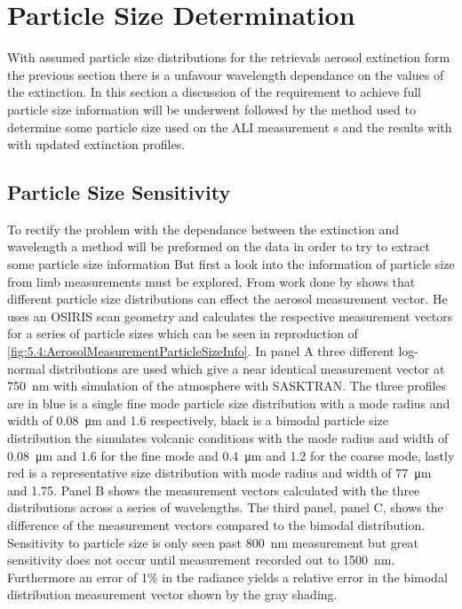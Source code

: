 \section{Particle Size Determination}
\label{sec:5.4:ParticleSizeDetermineation}

With assumed particle size distributions for the retrievals aerosol extinction form the previous section there is a unfavour wavelength dependance on the values of the extinction. In this section a discussion of the requirement to achieve full particle size information will be underwent followed by the method used to determine some particle size used on the ALI measurement s and the results with with updated extinction profiles.

\subsection{Particle Size Sensitivity}

To rectify the problem with the dependance between the extinction and wavelength a method will be preformed on the data in order to try to extract some particle size information But first a look into the information of particle size from limb measurements must be explored. From work done by \citep{Rieger2014} shows that different particle size distributions can effect the aerosol measurement vector. He uses an OSIRIS scan geometry and calculates the respective measurement vectors for a series of particle sizes which can be seen in reproduction of \autoref{fig:5.4:AerosolMeasurementParticleSizeInfo}. In panel A three different log-normal distributions are used which give a near identical measurement vector at 750~nm with simulation of the atmosphere with SASKTRAN. The three profiles are in blue is a single fine mode particle size distribution with a mode radius and width of 0.08~\si{\micro\meter} and 1.6 respectively, black is a bimodal particle size distribution the simulates volcanic conditions with the mode radius and width of 0.08~\si{\micro\meter} and 1.6 for the fine mode and 0.4~\si{\micro\meter} and 1.2 for the coarse mode, lastly red is a representative size distribution with mode radius and width of 77~\si{\micro\meter} and 1.75. Panel B shows the measurement vectors calculated with the three distributions across a series of wavelengths. The third panel, panel C, shows the difference of the measurement vectors compared to the bimodal distribution. Sensitivity to particle size is only seen past 800~nm measurement but great sensitivity does not occur until measurement recorded out to 1500~nm. Furthermore an error of 1\% in the radiance yields a relative error in the bimodal distribution measurement vector shown by the gray shading.

